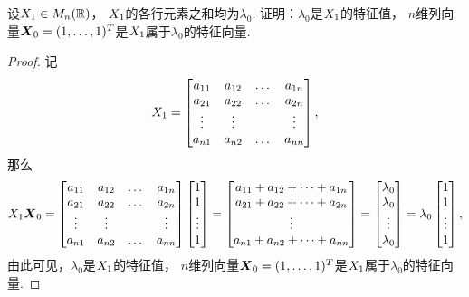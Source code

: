 \begin{example}
设\(X_1 \in M_n(\mathbb{R})\)，
\(X_1\)的各行元素之和均为\(\lambda_0\).
证明：\(\lambda_0\)是\(X_1\)的特征值，
\(n\)维列向量\(\boldsymbol{X}_0=(1,\dotsc,1)^T\)是\(X_1\)属于\(\lambda_0\)的特征向量.
\begin{proof}
记\[
	X_1
	= \begin{bmatrix}
		a_{11} & a_{12} & \dots & a_{1n} \\
		a_{21} & a_{22} & \dots & a_{2n} \\
		\vdots & \vdots & & \vdots \\
		a_{n1} & a_{n2} & \dots & a_{nn}
	\end{bmatrix},
\]
那么\[
	X_1 \boldsymbol{X}_0
	= \begin{bmatrix}
		a_{11} & a_{12} & \dots & a_{1n} \\
		a_{21} & a_{22} & \dots & a_{2n} \\
		\vdots & \vdots & & \vdots \\
		a_{n1} & a_{n2} & \dots & a_{nn}
	\end{bmatrix}
	\begin{bmatrix}
		1 \\ 1 \\ \vdots \\ 1
	\end{bmatrix}
	= \begin{bmatrix}
		a_{11} + a_{12} + \dotsb + a_{1n} \\
		a_{21} + a_{22} + \dotsb + a_{2n} \\
		\vdots \\
		a_{n1} + a_{n2} + \dotsb + a_{nn}
	\end{bmatrix}
	= \begin{bmatrix}
		\lambda_0 \\ \lambda_0 \\ \vdots \\ \lambda_0
	\end{bmatrix}
	= \lambda_0
	\begin{bmatrix}
		1 \\ 1 \\ \vdots \\ 1
	\end{bmatrix},
\]
由此可见，\(\lambda_0\)是\(X_1\)的特征值，
\(n\)维列向量\(\boldsymbol{X}_0=(1,\dotsc,1)^T\)是\(X_1\)属于\(\lambda_0\)的特征向量.
\end{proof}
\end{example}

